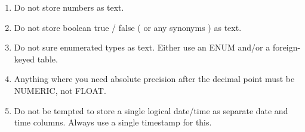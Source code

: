 \documentclass[slides]{pgnotes}
\begin{document}
\begin{enumerate}
  
\item Do not store numbers as text.

\item Do not store boolean true / false ( or any synonyms ) as text.

\item Do not sure enumerated types as text. Either use an ENUM and/or a foreign-keyed table.

\item Anything where you need absolute precision after the decimal point must be NUMERIC, not FLOAT. 
  
\item Do not be tempted to store a single logical date/time as separate date and time columns.
  Always use a single timestamp for this. 
  
\end{enumerate}
\end{document}

